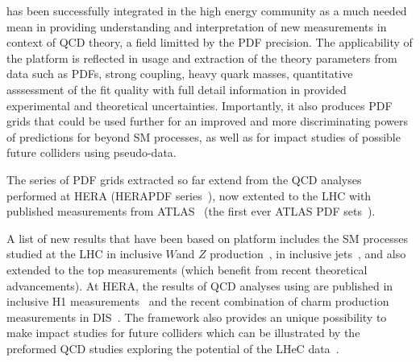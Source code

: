 \fitter has been successfully integrated in the high energy community as a much needed mean in providing understanding and interpretation of new measurements in context of QCD theory, a field limitted by the PDF precision.  
The applicability of the \fitter platform is reflected in usage and extraction of the theory parameters from data such as PDFs, strong coupling, heavy quark masses, quantitative asssessment of the fit quality with full detail information in provided experimental and theoretical uncertainties.
Importantly, it also produces PDF grids that could be used further for an improved and more discriminating powers of predictions for beyond SM processes, as well as for impact studies of possible future colliders using pseudo-data.

The series of PDF grids extracted so far extend from the QCD analyses performed at 
HERA (HERAPDF series~\cite{h1zeus:2009wt}), now extented to the LHC with published 
measurements from ATLAS~\cite{atlas:strange} (the first ever ATLAS PDF sets~\cite{atlas:grids}).

A list of new results that have been based on \fitter platform includes the SM processes 
studied at the LHC in inclusive $W$and $Z$ production~\cite{atlas:strange,atlas:hm,cms:strange},
in inclusive jets~\cite{atlas:jets,cms:jets}, and also extended 
to the top measurements (which benefit from recent theoretical advancements).
At HERA, the results of QCD analyses using \fitter are published in inclusive H1 measurements~\cite{h1:2012kk}
and the recent combination of charm production measurements in DIS~\cite{h1zeus:charm}.
The \fitter framework also provides an unique possibility to make impact studies for future colliders
which can be illustrated by the preformed QCD studies exploring the potential of the LHeC data~\cite{lhec:studies}.
